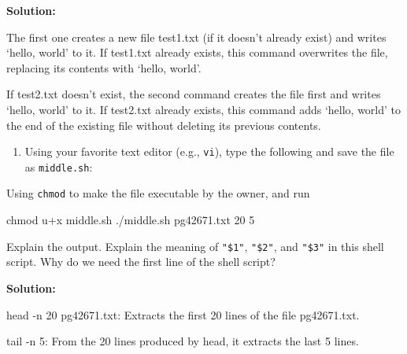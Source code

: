 \documentclass[
]{article}
\newenvironment{Shaded}{\begin{snugshade}}{\end{snugshade}}
\newcommand{\AttributeTok}[1]{\textcolor[rgb]{0.40,0.45,0.13}{#1}}
\newcommand{\CommentTok}[1]{\textcolor[rgb]{0.37,0.37,0.37}{#1}}
\newcommand{\ExtensionTok}[1]{\textcolor[rgb]{0.00,0.23,0.31}{#1}}
\newcommand{\FunctionTok}[1]{\textcolor[rgb]{0.28,0.35,0.67}{#1}}
\newcommand{\KeywordTok}[1]{\textcolor[rgb]{0.00,0.23,0.31}{#1}}
\newcommand{\NormalTok}[1]{\textcolor[rgb]{0.00,0.23,0.31}{#1}}
\newcommand{\StringTok}[1]{\textcolor[rgb]{0.13,0.47,0.30}{#1}}
\newcommand{\VariableTok}[1]{\textcolor[rgb]{0.07,0.07,0.07}{#1}}
\providecommand{\tightlist}{%
  \setlength{\itemsep}{0pt}\setlength{\parskip}{0pt}}\usepackage{longtable,booktabs,array}
\begin{document}
\textbf{Solution:}

The first one creates a new file test1.txt (if it doesn't already exist)
and writes `hello, world' to it. If test1.txt already exists, this
command overwrites the file, replacing its contents with `hello, world'.

If test2.txt doesn't exist, the second command creates the file first
and writes `hello, world' to it. If test2.txt already exists, this
command adds `hello, world' to the end of the existing file without
deleting its previous contents.

\begin{enumerate}
\def\labelenumi{\arabic{enumi}.}
\setcounter{enumi}{2}
\tightlist
\item
  Using your favorite text editor (e.g., \texttt{vi}), type the
  following and save the file as \texttt{middle.sh}:
\end{enumerate}

\begin{Shaded}
\end{Shaded}

Using \texttt{chmod} to make the file executable by the owner, and run

\begin{Shaded}
\begin{Highlighting}[]
\FunctionTok{chmod}\NormalTok{ u+x middle.sh}
\ExtensionTok{./middle.sh}\NormalTok{ pg42671.txt 20 5}
\end{Highlighting}
\end{Shaded}

Explain the output. Explain the meaning of \texttt{"\$1"},
\texttt{"\$2"}, and \texttt{"\$3"} in this shell script. Why do we need
the first line of the shell script?

\textbf{Solution:}

head -n 20 pg42671.txt: Extracts the first 20 lines of the file
pg42671.txt.

tail -n 5: From the 20 lines produced by head, it extracts the last 5
lines.
\end{document}
